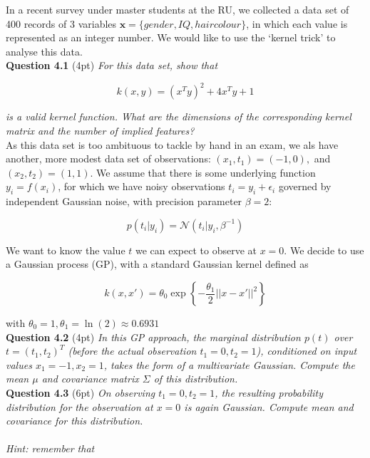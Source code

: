 \documentclass[a4paper]{article}
\begin{document}
In a recent survey under master students at the RU, we collected a data set of 400 records of 3 variables $\textbf{x} = \{ gender, IQ, haircolour \}$, in which each value is represented as an integer number. We would like to use the ‘kernel trick’ to analyse this data.\\

\textbf{Question 4.1} (4pt) \textit{For this data set, show that}

\begin{equation}
	k(x, y) = (x^T y)^2 + 4x^T y + 1
\end{equation}

\textit{is a valid kernel function. What are the dimensions of the corresponding kernel matrix and the number of implied features?}\\


As this data set is too ambituous to tackle by hand in an exam, we als have another, more modest data set of observations: $(x_1, t_1) = (-1, 0),$ and $(x_2, t_2) = (1, 1)$. We assume that there is some
underlying function $y_i = f(x_i)$, for which we have noisy observations $t_i = y_i + \epsilon_i$ governed by
independent Gaussian noise, with precision parameter $\beta = 2$:

\begin{equation}
	p(t_i | y_i) = \mathcal{N}(t_i | y_i, \beta^{-1})
\end{equation}

We want to know the value $t$ we can expect to observe at $x = 0$. We decide to use a Gaussian process (GP), with a standard Gaussian kernel defined as 

\begin{equation}
k(x, x') = \theta_0 \exp \left\{ -\frac{ \theta_1}{2} || x - x' ||^2 \right\}
\end{equation}

with $\theta_0 = 1, \theta_1 = \ln(2) \approx 0.6931$\\

\textbf{Question 4.2} (4pt) \textit{In this GP approach, the marginal distribution $p(t)$ over $t = (t_1, t_2)^T$ (before the actual observation $t_1 = 0, t_2 = 1$), conditioned on input values $x_1 = -1, x_2 = 1$, takes the form of a multivariate Gaussian. Compute the mean $\mu$  and covariance matrix  $\Sigma$ of this distribution.}\\


\textbf{Question 4.3} (6pt) \textit{On observing $t_1 = 0, t_2 = 1$, the resulting probability distribution for the observation at $x = 0$ is again Gaussian. Compute mean and covariance for this distribution.}\\
\textit{\\Hint: remember that}
\end{document}
